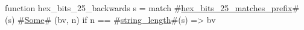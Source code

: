 function hex_bits_25_backwards s =
  match #\hyperref[sailRISCVzhexzybitszy25zymatcheszyprefix]{hex\_bits\_25\_matches\_prefix}#(s) {
      #\hyperref[sailRISCVzSome]{Some}# (bv, n) if n == #\hyperref[sailRISCVzstringzylength]{string\_length}#(s) => bv
  }
